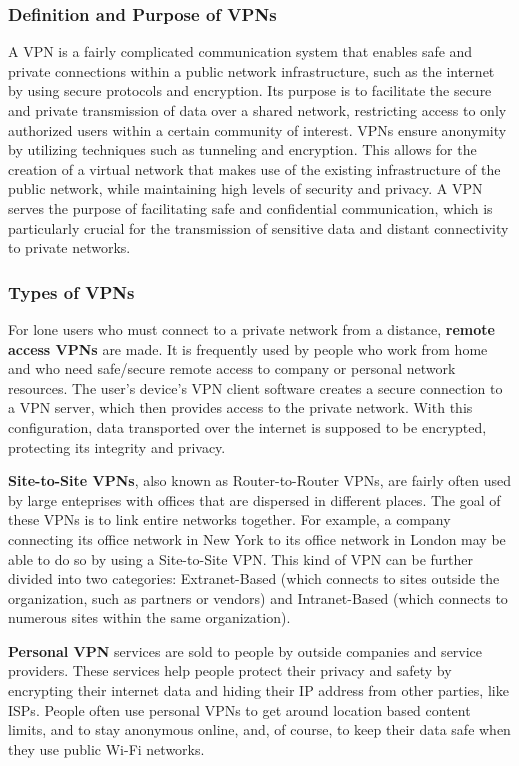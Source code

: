 \documentclass[12pt, fleqn, a4paper]{article}
\begin{document}
\subsubsection{Definition and Purpose of VPNs}
A VPN is a fairly complicated communication system that enables safe and private connections within a public network infrastructure, such as the internet by using secure protocols and encryption. Its purpose is to facilitate the secure and private transmission of data over a shared network, restricting access to only authorized users within a certain community of interest.\citep{whatvpn} VPNs ensure anonymity by utilizing techniques such as tunneling and encryption. This allows for the creation of a virtual network that makes use of the existing infrastructure of the public network, while maintaining high levels of security and privacy. A VPN serves the purpose of facilitating safe and confidential communication, which is particularly crucial for the transmission of sensitive data and distant connectivity to private networks.
\subsubsection{Types of VPNs}

For lone users who must connect to a private network from a distance, \textbf{remote access VPNs} are made. It is frequently used by people who work from home and who need safe/secure remote access to company or personal network resources. The user's device's VPN client software creates a secure connection to a VPN server, which then provides access to the private network. With this configuration, data transported over the internet is supposed to be encrypted, protecting its integrity and privacy.

\textbf{Site-to-Site VPNs},
also known as Router-to-Router VPNs, are fairly often used by large enteprises with offices that are dispersed in different places. The goal of these VPNs is to link entire networks together. For example, a company connecting its office network in New York to its office network in London may be able to do so by using a Site-to-Site VPN. This kind of VPN can be further divided into two categories: Extranet-Based (which connects to sites outside the organization, such as partners or vendors) and Intranet-Based (which connects to numerous sites within the same organization). \citep{sitetosite}

\textbf{Personal VPN} 
services are sold to people by outside companies and service providers. These services help people protect their privacy and safety by encrypting their internet data and hiding their IP address from other parties, like ISPs. People often use personal VPNs to get around location based content limits, and to stay anonymous online, and, of course, to keep their data safe when they use public Wi-Fi networks.
\end{document}
